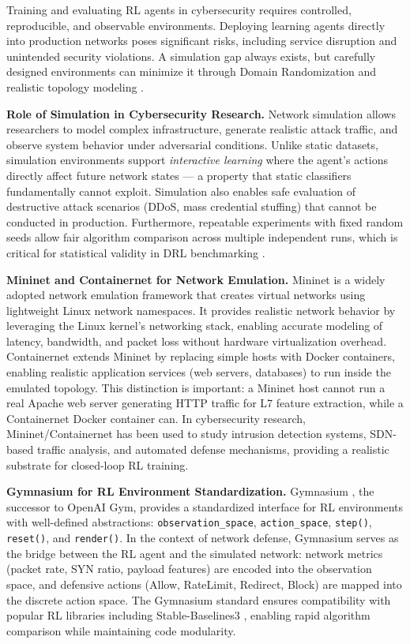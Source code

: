 \documentclass[12pt,a4paper]{report}
\begin{document}
Training and evaluating RL agents in cybersecurity requires controlled, reproducible, and observable environments. Deploying learning agents directly into production networks poses significant risks, including service disruption and unintended security violations. A simulation gap always exists, but carefully designed environments can minimize it through Domain Randomization and realistic topology modeling \cite{lantzMininet2010}.

\textbf{Role of Simulation in Cybersecurity Research.} Network simulation allows researchers to model complex infrastructure, generate realistic attack traffic, and observe system behavior under adversarial conditions. Unlike static datasets, simulation environments support \textit{interactive learning} where the agent's actions directly affect future network states --- a property that static classifiers fundamentally cannot exploit. Simulation also enables safe evaluation of destructive attack scenarios (DDoS, mass credential stuffing) that cannot be conducted in production. Furthermore, repeatable experiments with fixed random seeds allow fair algorithm comparison across multiple independent runs, which is critical for statistical validity in DRL benchmarking \cite{henderson2018deeprl}.

\textbf{Mininet and Containernet for Network Emulation.} Mininet \cite{lantzMininet2010} is a widely adopted network emulation framework that creates virtual networks using lightweight Linux network namespaces. It provides realistic network behavior by leveraging the Linux kernel's networking stack, enabling accurate modeling of latency, bandwidth, and packet loss without hardware virtualization overhead. Containernet \cite{containernetPeuster2016} extends Mininet by replacing simple hosts with Docker containers, enabling realistic application services (web servers, databases) to run inside the emulated topology. This distinction is important: a Mininet host cannot run a real Apache web server generating HTTP traffic for L7 feature extraction, while a Containernet Docker container can. In cybersecurity research, Mininet/Containernet has been used to study intrusion detection systems, SDN-based traffic analysis, and automated defense mechanisms, providing a realistic substrate for closed-loop RL training.

\textbf{Gymnasium for RL Environment Standardization.} Gymnasium \cite{gymnasium2023}, the successor to OpenAI Gym, provides a standardized interface for RL environments with well-defined abstractions: \texttt{observation\_space}, \texttt{action\_space}, \texttt{step()}, \texttt{reset()}, and \texttt{render()}. In the context of network defense, Gymnasium serves as the bridge between the RL agent and the simulated network: network metrics (packet rate, SYN ratio, payload features) are encoded into the observation space, and defensive actions (Allow, RateLimit, Redirect, Block) are mapped into the discrete action space. The Gymnasium standard ensures compatibility with popular RL libraries including Stable-Baselines3 \cite{raffin2021sb3}, enabling rapid algorithm comparison while maintaining code modularity.
\end{document}
